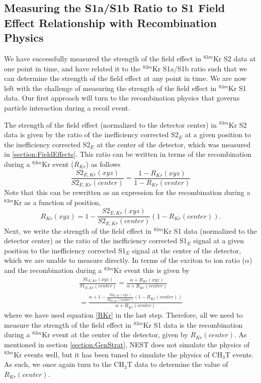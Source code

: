 \documentclass[a4paper,10pt,twocolumn]{article}
\begin{document}
\subsection{Measuring the S1a/S1b Ratio to S1 Field Effect Relationship with Recombination Physics} \label{section:S1relation}

We have successfully measured the strength of the field effect in $^{83m}$Kr S2 data at one point in time, and have related it to the $^{83m}$Kr S1a/S1b ratio such that we can determine the strength of the field effect at any point in time.  We are now left with the challenge of measuring the strength of the field effect in $^{83m}$Kr S1 data. Our first approach will turn to the recombination physics that governs particle interaction during a recoil event.  

The strength of the field effect (normalized to the detector center) in $^{83m}$Kr S2 data is given by the ratio of the inefficiency corrected S2$_E$ at a given position to the inefficiency corrected S2$_E$ at the center of the detector, which was measured in \ref{section:FieldEffects}.  This ratio can be written in terms of the recombination during a $^{83m}$Kr event ($R_{Kr}$) as follows
\begin{equation}
\frac{S2_{E,Kr}(xyz)}{S2_{E,Kr}(center)} = \frac{1-R_{Kr}(xyz)}{1-R_{Kr}(center)}
\end{equation}
Note that this can be rewritten as an expression for the recombination during a $^{83m}$Kr as a function of position,
\begin{equation} \label{RKr}
R_{Kr}(xyz) = 1- \frac{S2_{E,Kr}(xyz)}{S2_{E,Kr}(center)}(1-R_{Kr}(center)).
\end{equation}
Next, we write the strength of the field effect in $^{83m}$Kr S1 data (normalized to the detector center) as the ratio of the inefficiency corrected S1$_E$ signal at a given position to the inefficiency corrected S1$_E$ signal at the center of the detector, which we are unable to measure directly.  In terms of the exciton to ion ratio ($\alpha$) and the recombination during a $^{83m}$Kr event this is given by 
\begin{multline} \label{S1fieldstrength}
\frac{S1_{E,Kr}(xyz)}{S1_{E,Kr}(center)}=\frac{\alpha+R_{Kr}(xyz)}{\alpha+R_{Kr}(center)} \\ = \frac{\alpha + 1 - \frac{S2_{E,Kr}(xyz)}{S2_{E,Kr}(center)}(1-R_{Kr}(center))}{\alpha + R_{Kr}(center)}
\end{multline}
where we have used equation \ref{RKr} in the last step.  Therefore, all we need to measure the strength of the field effect in $^{83m}$Kr S1 data is the recombination during a $^{83m}$Kr event at the center of the detector, given by $R_{Kr}(center)$.  As mentioned in section \ref{section:GenStrat}, NEST does not simulate the physics of $^{83m}$Kr events well, but it has been tuned to simulate the physics of CH$_3$T events.  As such, we once again turn to the CH$_3$T data to determine the value of $R_{Kr}(center)$. 
\end{document}
